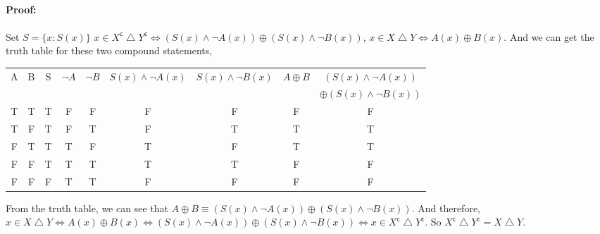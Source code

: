 \documentclass[a4paper,12pt,titlepage]{article}
\begin{document}
\subsection{}
\paragraph{Proof:} Set $S=\lbrace x:S(x)\rbrace$ $x \in X^{\mathsf{c}}\bigtriangleup Y^{\mathsf{c}}\Leftrightarrow (S(x)\wedge\neg A(x))\oplus (S(x)\wedge\neg B(x))$, 
 $x \in X\bigtriangleup Y\Leftrightarrow A(x)\oplus B(x)$. And we can get the truth table for these two compound statements,

\begin{table}[ht]
\newcommand{\tabincell}[2]{\begin{tabular}{@{}#1@{}}#2\end{tabular}}
  \centering
\begin{tabular}{|c|c|c|c|c|c|c|c|c|}
\hline
\hline
A & B & S & $\neg A$ & $\neg B$ & $S(x)\wedge\neg A(x)$ & $S(x)\wedge\neg B(x)$ & $A\oplus B$ &  $(S(x)\wedge\neg A(x))$\\
&&&&&&&&$\oplus (S(x)\wedge\neg B(x))$ \\
\hline
T & T & T & F & F & F & F & F & F \\
\hline
T & F & T & F & T & F & T & T & T \\
\hline
F & T & T & T & F & T & F & T & T \\
\hline
F & F & T & T & T & T & T & F & F \\
\hline
F & F & F & T & T & F & F & F & F \\
\hline
\hline
\end{tabular}
\end{table}
From the truth table, we can see that $A\oplus B\equiv(S(x)\wedge\neg A(x))\oplus (S(x)\wedge\neg B(x))$.    And therefore, $x \in X\bigtriangleup Y\Leftrightarrow A(x)\oplus B(x)\Leftrightarrow (S(x)\wedge\neg A(x))\oplus (S(x)\wedge\neg B(x))\Leftrightarrow x \in X^{\mathsf{c}}\bigtriangleup Y^{\mathsf{c}}$. So $X^{\mathsf{c}}\bigtriangleup Y^{\mathsf{c}}=X\bigtriangleup Y$.
\end{document}
